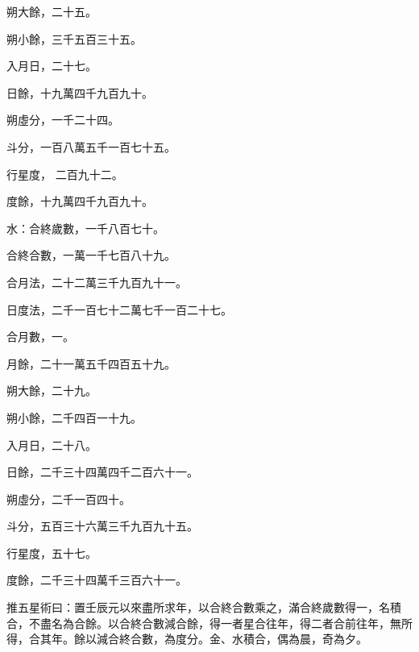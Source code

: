 \begin{pinyinscope}
 朔大餘，二十五。



 朔小餘，三千五百三十五。



 入月日，二十七。



 日餘，十九萬四千九百九十。



 朔虛分，一千二十四。



 斗分，一百八萬五千一百七十五。



 行星度，
 二百九十二。



 度餘，十九萬四千九百九十。



 水：合終歲數，一千八百七十。



 合終合數，一萬一千七百八十九。



 合月法，二十二萬三千九百九十一。



 日度法，二千一百七十二萬七千一百二十七。



 合月數，一。



 月餘，二十一萬五千四百五十九。



 朔大餘，二十九。



 朔小餘，二千四百一十九。



 入月日，二十八。



 日餘，二千三十四萬四千二百六十一。



 朔虛分，二千一百四十。



 斗分，五百三十六萬三千九百九十五。



 行星度，五十七。



 度餘，二千三十四萬千三百六十一。



 推五星術曰：置壬辰元以來盡所求年，以合終合數乘之，滿合終歲數得一，名積合，不盡名為合餘。以合終合數減合餘，得一者星合往年，得二者合前往年，無所得，合其年。餘以減合終合數，為度分。金、水積合，偶為晨，奇為夕。




\end{pinyinscope}
